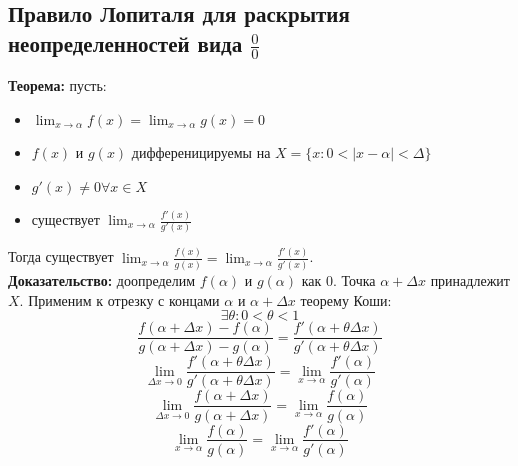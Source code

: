 \documentclass{article}
\newcommand{\theorem}{\textbf{Теорема:} }
\newcommand{\proof}{\textbf{Доказательство:} }
\begin{document}
    \subsection*{Правило Лопиталя для раскрытия неопределенностей вида $\frac{0}{0}$}
        \theorem пусть:
        \begin {itemize}
            \item $ \lim_{x \to \alpha} f(x) = \lim_{x \to \alpha} g(x) = 0 $
            \item $ f(x)$ и $g(x)$ дифференицируемы на $X = \{x: 0 < |x - \alpha| < \Delta \} $
            \item $ g'(x)\neq 0 \forall x \in X $
            \item существует $ \lim_{x \to \alpha} \frac{f'(x)}{g'(x)} $
        \end {itemize}
        Тогда существует $ \lim_{x \to \alpha} \frac{f(x)}{g(x)} = \lim_{x \to \alpha} \frac{f'(x)}{g'(x)} $.
        \\
        \proof доопределим $f(\alpha)$ и $g(\alpha)$ как $0$.
        Точка $\alpha + \Delta x$ принадлежит $X$. Применим к отрезку с концами $\alpha$ и $\alpha + \Delta x$ теорему Коши:
        \[ \exists \theta: 0 < \theta < 1 \]
        \[ \frac{f(\alpha + \Delta x) - f(\alpha)}{g(\alpha + \Delta x) - g(\alpha)} = \frac{f'(\alpha + \theta \Delta x)}{g'(\alpha + \theta \Delta x)} \]
        \[ \lim_{\Delta x \to 0} \frac{f'(\alpha + \theta \Delta x)}{g'(\alpha + \theta \Delta x)} = \lim_{x \to \alpha} \frac{f'(\alpha)}{g'(\alpha)} \]
        \[ \lim_{\Delta x \to 0} \frac{f(\alpha + \Delta x)}{g(\alpha + \Delta x)} = \lim_{x \to \alpha} \frac{f(\alpha)}{g(\alpha)} \]
        \[ \lim_{x \to \alpha} \frac{f(\alpha)}{g(\alpha)} = \lim_{x \to \alpha} \frac{f'(\alpha)}{g'(\alpha)} \]
\end{document}

